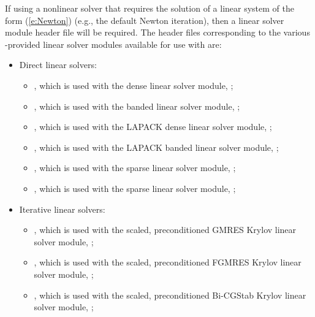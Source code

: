 If using a nonlinear solver that requires the solution of a linear
system of the form (\ref{e:Newton}) (e.g., the default Newton iteration),
then a linear solver module header file will be required.
The header files corresponding to the various {\sundials}-provided
linear solver modules available for use with {\cvodes} are:
\begin{itemize}
\item Direct linear solvers:
  \begin{itemize}
  \item {},
    which is used with the dense linear solver module,
    {\sunlinsoldense};

  \item {},
    which is used with the banded linear solver module,
    {\sunlinsolband};

  \item {},
    which is used with the LAPACK dense linear solver module,
    {\sunlinsollapdense};

  \item {},
    which is used with the LAPACK banded linear solver module,
    {\sunlinsollapband};

  \item {},
    which is used with the {\klu} sparse linear solver module,
    {\sunlinsolklu};

  \item {},
    which is used with the {\superlumt} sparse linear solver
    module, {\sunlinsolslumt};
  \end{itemize}

\item Iterative linear solvers:
  \begin{itemize}
  \item {},
    which is used with the scaled, preconditioned GMRES Krylov linear
    solver module, {\sunlinsolspgmr};

  \item {},
    which is used with the scaled, preconditioned FGMRES Krylov linear
    solver module, {\sunlinsolspfgmr};

  \item {},
    which is used with the scaled, preconditioned Bi-CGStab Krylov
    linear solver module, {\sunlinsolspbcgs};


\end{itemize}
\end{itemize}
